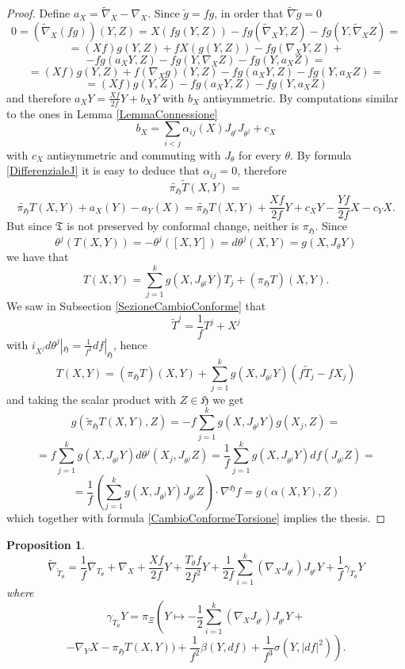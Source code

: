 \documentclass{article}
\newcommand{\g}[1]{\mathfrak{#1}}
\newcommand{\alfa}{\alpha}
\newtheorem{proposizione}{Proposition}[section]
\theoremstyle{definition}
\theoremstyle{remark}
\begin{document}
\begin{proof}
 Define $a_X = \widetilde{\nabla}_X-\nabla_X$. Since $\widetilde{g}=fg$, in order that $\widetilde{\nabla}\widetilde{g} = 0$
 $$0 = (\widetilde{\nabla}_X(fg))(Y,Z) = X(fg(Y,Z)) - fg(\widetilde{\nabla}_XY,Z) - fg(Y,\widetilde{\nabla}_XZ) =$$
 $$= (Xf)g(Y,Z) + fX(g(Y,Z)) - fg(\nabla_XY,Z) +$$
 $$- fg(a_XY,Z) - fg(Y,\nabla_XZ) - fg(Y,a_XZ) =$$
 $$= (Xf)g(Y,Z) + f(\nabla_Xg)(Y,Z) - fg(a_XY,Z) - fg(Y,a_XZ) =$$
 $$= (Xf)g(Y,Z)  - fg(a_XY,Z) - fg(Y,a_XZ) $$
 and therefore $a_XY=\frac{Xf}{2f}Y + b_XY$ with $b_X$ antisymmetric.
 By computations similar to the ones in Lemma \ref{LemmaConnessione}
 $$b_X = \sum_{i<j}\alfa_{ij}(X)J_{\theta^i}J_{\theta^j}+c_X$$
 with $c_X$ antisymmetric and commuting with $J_{\theta}$ for every $\theta$.
 By formula \eqref{DifferenzialeJ} it is easy to deduce that $\alfa_{ij}=0$, therefore
 $$ \widetilde{\pi_{\g{H}}}\widetilde{T}(X,Y)=$$
 \begin{equation}\label{CambioConformeTorsione}
   \widetilde{\pi_{\g{H}}}T(X,Y) + a_X(Y)-a_Y(X) = \widetilde{\pi_{\g{H}}}T(X,Y) + \frac{Xf}{2f}Y + c_XY -\frac{Yf}{2f}X - c_YX.
 \end{equation}
 But since $\g{T}$ is not preserved by conformal change, neither is $\pi_{\g{H}}$.
 Since
 $$\theta^j(T(X,Y)) = -\theta^j([X,Y]) = d\theta^j(X,Y)= g(X,J_{\theta}Y)$$
 we have that
 $$T(X,Y) = \sum_{j=1}^kg(X,J_{\theta^j}Y)T_j + (\pi_{\g{H}}T)(X,Y).$$
 We saw in Subsection \ref{SezioneCambioConforme} that
 $$\widetilde{T}^j = \frac{1}{f}T^j + X^j$$
 with $i_{X^j}d\theta^j|_{\g{H}} = \frac{1}{f^2}df|_{\g{H}}$, hence
 $$T(X,Y) = (\pi_{\g{H}}T)(X,Y) + \sum_{j=1}^kg(X,J_{\theta^j}Y)(f\widetilde{T}_j - fX_j)$$
 and taking the scalar product with $Z\in\g{H}$ we get
 $$g(\widetilde{\pi}_{\g{H}}T(X,Y),Z) = - f\sum_{j=1}^kg(X,J_{\theta^j}Y)g(X_j,Z) =$$
 $$= f\sum_{j=1}^kg(X,J_{\theta^j}Y)d\theta^j(X_j,J_{\theta^j}Z) = \frac{1}{f}\sum_{j=1}^kg(X,J_{\theta^j}Y)df(J_{\theta^j}Z) =$$
 $$= \frac{1}{f}\left(\sum_{j=1}^kg(X,J_{\theta^j}Y)J_{\theta^j}Z\right)\cdot \nabla^{\g{H}}f = g(\alfa(X,Y),Z)$$
 which together with formula \eqref{CambioConformeTorsione} implies the thesis.
\end{proof}

\begin{proposizione}
 $$\widetilde{\nabla}_{\widetilde{T}_{\theta}} =  \frac{1}{f}\nabla_{T_{\theta}} + \nabla_X + \frac{Xf}{2f}Y +\frac{T_{\theta}f}{2f^2}Y + \frac{1}{2f}\sum_{i=1}^k(\nabla_XJ_{\theta^i})J_{\theta^i}Y+ \frac{1}{f}\gamma_{T_{\theta}}Y $$
 where
 $$\gamma_{T_{\theta}}Y =\pi_{\Xi}\left(Y\mapsto -\frac{1}{2}\sum_{i=1}^k(\nabla_XJ_{\theta^i})J_{\theta^i}Y+\right.$$
 $$\left. - \nabla_YX - \pi_{\g{H}}T(X,Y)) +\frac{1}{f^2}\beta(Y,df) +\frac{1}{f^3}\sigma(Y,|df|^2) \right).$$
\end{proposizione}
\end{document}
